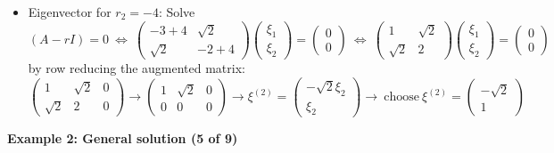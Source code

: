 \documentclass[11pt,a4paper]{article}
\begin{document}
	\begin{itemize}
		\item Eigenvector for $r_2 = -4$: Solve
		$$
		(A-rI) = 0\ \Leftrightarrow\ 
		\begin{pmatrix}
			-3+4 & \sqrt{2}\\
			\sqrt{2} & -2+4
		\end{pmatrix}
		\begin{pmatrix}
			\xi_1\\
			\xi_2
		\end{pmatrix}=
		\begin{pmatrix}
			0\\
			0
		\end{pmatrix}\ \Leftrightarrow\ 
		\begin{pmatrix}
			1 & \sqrt{2}\\
			\sqrt{2} & 2
		\end{pmatrix}
		\begin{pmatrix}
			\xi_1\\
			\xi_2
		\end{pmatrix}=
		\begin{pmatrix}
			0\\
			0
		\end{pmatrix}
		$$
		by row reducing the augmented matrix:\\
		$
		\begin{pmatrix}
			1 & \sqrt{2} & 0\\
			\sqrt{2} & 2 & 0
		\end{pmatrix}\to
		\begin{pmatrix}
			1 & \sqrt{2} & 0\\
			0 & 0 & 0
		\end{pmatrix}\to \xi^{(2)} =
		\begin{pmatrix}
			-\sqrt{2}\xi_2\\
			\xi_2
		\end{pmatrix}\to\ \text{choose}\ \xi^{(2)} =
		\begin{pmatrix}
			-\sqrt{2}\\
			1
		\end{pmatrix}
		$
	\end{itemize}
	\textbf{Example 2: General solution (5 of 9)}
\end{document}

